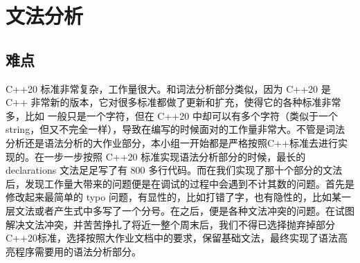 \section{文法分析}



\subsection{难点}

C++20 标准非常复杂，工作量很大。和词法分析部分类似，因为 C++20 是 C++ 非常新的版本，它对很多标准都做了更新和扩充，使得它的各种标准非常多，比如  一般只是一个字符，但在 C++20 中却可以有多个字符（类似于一个 string，但又不完全一样），导致在编写的时候面对的工作量非常大。不管是词法分析还是语法分析的大作业部分，本小组一开始都是严格按照C++标准去进行实现的。在一步一步按照 C++20 标准实现语法分析部分的时候，最长的 declarations 文法足足写了有 800 多行代码。而在我们实现了那十个部分的文法后，发现工作量大带来的问题便是在调试的过程中会遇到不计其数的问题。首先是修改起来最简单的 typo 问题，有显性的，比如打错了字，也有隐性的，比如某一层文法或者产生式中多写了一个分号。在之后，便是各种文法冲突的问题。在试图解决文法冲突，并苦苦挣扎了将近一整个周末后，我们不得已选择抛弃掉部分 C++20标准，选择按照大作业文档中的要求，保留基础文法，最终实现了语法高亮程序需要用的语法分析部分。